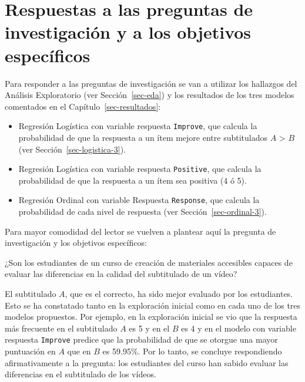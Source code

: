 \documentclass[
  12pt,
  a4paper,
  extrafontsizes,
  onecolumn,
  openright,
  table]{memoir}
\providecommand{\tightlist}{%
  \setlength{\itemsep}{0pt}\setlength{\parskip}{0pt}}\usepackage{longtable,booktabs,array}
\begin{document}
\hypertarget{respuestas-a-las-preguntas-de-investigaciuxf3n-y-a-los-objetivos-especuxedficos}{%
\section{Respuestas a las preguntas de investigación y a los objetivos
específicos}\label{respuestas-a-las-preguntas-de-investigaciuxf3n-y-a-los-objetivos-especuxedficos}}

Para responder a las preguntas de investigación se van a utilizar los
hallazgos del Análisis Exploratorio (ver Sección~\ref{sec-eda}) y los
resultados de los tres modelos comentados en el
Capítulo~\ref{sec-resultados}:

\begin{itemize}
\tightlist
\item
  \gls{Regresión Logística} con variable respuesta \texttt{Improve}, que
  calcula la probabilidad de que la respuesta a un ítem mejore entre
  subtitulados \(A\) \textgreater{} \(B\) \nobreak (ver
  Sección~\ref{sec-logistica-3}).
\item
  \gls{Regresión Logística} con variable respuesta \texttt{Positive},
  que calcula la probabilidad de que la respuesta a un ítem sea positiva
  (4 ó 5).
\item
  \gls{Regresión Ordinal} con variable Respuesta \texttt{Response}, que
  calcula la probabilidad de cada nivel de respuesta (ver
  Sección~\ref{sec-ordinal-3}).
\end{itemize}

Para mayor comodidad del lector se vuelven a plantear aquí la pregunta
de investigación y los objetivos específicos:

\begin{tcolorbox}[enhanced jigsaw, rightrule=.15mm, colback=white, toptitle=1mm, colbacktitle=quarto-callout-note-color!10!white, toprule=.15mm, titlerule=0mm, bottomtitle=1mm, opacitybacktitle=0.6, colframe=quarto-callout-note-color-frame, coltitle=black, leftrule=.75mm, bottomrule=.15mm, title=\textcolor{quarto-callout-note-color}{\faInfo}\hspace{0.5em}{Pregunta de investigación}, arc=.35mm, breakable, opacityback=0, left=2mm]

¿Son los estudiantes de un curso de creación de materiales accesibles
capaces de evaluar las diferencias en la calidad del subtitulado de un
vídeo?

\end{tcolorbox}

El subtitulado \(A\), que es el correcto, ha sido mejor evaluado por los
estudiantes. Esto se ha constatado tanto en la exploración inicial como
en cada uno de los tres modelos propuestos. Por ejemplo, en la
exploración inicial se vio que la respuesta más frecuente en el
subtitulado \(A\) es 5 y en el \(B\) es 4 y en el modelo con variable
respuesta \texttt{Improve} predice que la probabilidad de que se otorgue
una mayor puntuación en \(A\) que en \(B\) es 59.95\%. Por lo tanto, se
concluye respondiendo afirmativamente a la pregunta: los estudiantes del
curso han sabido evaluar las diferencias en el subtitulado de los
vídeos.
\end{document}
